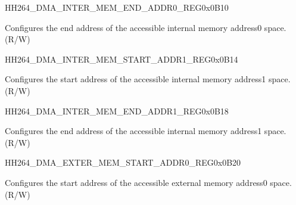     
    \begin{register}{H}{H264\_DMA\_INTER\_MEM\_END\_ADDR0\_REG}{0x0B10}\label{regdesc:H264DMAINTERMEMENDADDR0REG}
    \regnewline%
    \begin{regdesc}\begin{reglist}
    \label{fielddesc:H264DMAACCESSINTERMEMENDADDR0}\item [H264\_DMA\_ACCESS\_INTER\_MEM\_END\_ADDR0] Configures the end address of the accessible internal memory address0 space. (R/W)
    \end{reglist}\end{regdesc}
    \end{register}
    
    
    \begin{register}{H}{H264\_DMA\_INTER\_MEM\_START\_ADDR1\_REG}{0x0B14}\label{regdesc:H264DMAINTERMEMSTARTADDR1REG}
    \regnewline%
    \begin{regdesc}\begin{reglist}
    \label{fielddesc:H264DMAACCESSINTERMEMSTARTADDR1}\item [H264\_DMA\_ACCESS\_INTER\_MEM\_START\_ADDR1] Configures the start address of the accessible internal memory address1 space. (R/W)
    \end{reglist}\end{regdesc}
    \end{register}
    
    
    \begin{register}{H}{H264\_DMA\_INTER\_MEM\_END\_ADDR1\_REG}{0x0B18}\label{regdesc:H264DMAINTERMEMENDADDR1REG}
    \regnewline%
    \begin{regdesc}\begin{reglist}
    \label{fielddesc:H264DMAACCESSINTERMEMENDADDR1}\item [H264\_DMA\_ACCESS\_INTER\_MEM\_END\_ADDR1] Configures the end address of the accessible internal memory address1 space. (R/W)
    \end{reglist}\end{regdesc}
    \end{register}
    
    
    \begin{register}{H}{H264\_DMA\_EXTER\_MEM\_START\_ADDR0\_REG}{0x0B20}\label{regdesc:H264DMAEXTERMEMSTARTADDR0REG}
    \regnewline%
    \begin{regdesc}\begin{reglist}
    \label{fielddesc:H264DMAACCESSEXTERMEMSTARTADDR0}\item [H264\_DMA\_ACCESS\_EXTER\_MEM\_START\_ADDR0] Configures the start address of the accessible external memory address0 space. (R/W)
    \end{reglist}\end{regdesc}
    \end{register}
    
